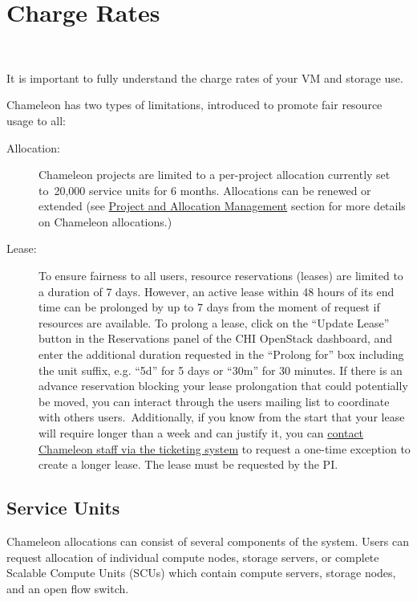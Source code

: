 \section{Charge Rates}
\label{C:cc-charge}

\FILENAME\

It is important to fully understand the charge rates of your VM and storage use.

Chameleon has two types of limitations, introduced to promote fair resource
usage to all:

\begin{description}

\item  [Allocation:] Chameleon projects are limited to a per-project allocation
  currently set to~20,000 service units for 6 months. Allocations can be
  renewed or extended (see
  \href{index.html\#toc-project-and-allocation-management}{Project and
  Allocation Management} section for more details on Chameleon
allocations.)

  \item [Lease:] To ensure fairness to all users, resource reservations (leases)
  are limited to a duration of 7 days. However, an active lease within
  48 hours of its end time can be prolonged by up to 7 days from the
  moment of request if resources are available. To prolong a lease,
  click on the ``Update Lease'' button in the Reservations panel of the
  CHI OpenStack dashboard, and enter the additional duration requested
  in the ``Prolong for'' box including the unit suffix, e.g. ``5d'' for
  5 days or ``30m'' for 30 minutes. If there is an advance reservation
  blocking your lease prolongation that could potentially be moved,
  you can interact through the users mailing list to coordinate with
  others  users.~Additionally, if you know from the start that your
  lease will  require longer than a week and can justify it, you can
  \href{https://www.chameleoncloud.org/user/help/ticket/new/}{contact
    Chameleon staff via the ticketing system} to request a one-time
  exception to create a longer lease. The lease must be requested by
  the PI.

\end{description}

\subsection{Service Units}

Chameleon allocations can consist of several components of the system.
Users can request allocation of individual compute nodes, storage
servers, or complete Scalable Compute Units (SCUs) which contain compute
servers, storage nodes, and an open flow switch.

